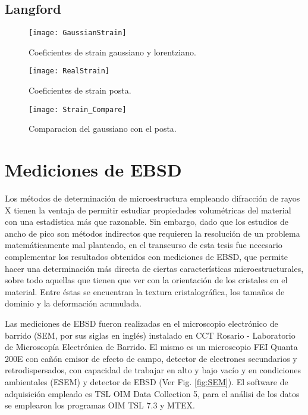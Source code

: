 \subsection{Langford}\label{SS:MLgfrd}

\begin{figure}[!htb]
  \centering
  \texttt{[image: GaussianStrain]}
  \caption{Coeficientes de strain gaussiano y lorentziano.}
  \label{fig:GaussStrainn}
\end{figure}

\begin{figure}[!htb]
  \centering
  \texttt{[image: RealStrain]}
  \caption{Coeficientes de strain posta.}
  \label{fig:RealStrain}
\end{figure}

\begin{figure}[!htb]
  \centering
  \texttt{[image: Strain\_Compare]}
  \caption{Comparacion del gaussiano con el posta.}
  \label{fig:RealvsGauss}
\end{figure}

\newpage
\fi
\section{Mediciones de EBSD}\label{S:MatEBSD}
Los métodos de determinación de microestructura empleando difracción de rayos X tienen la ventaja de permitir estudiar propiedades volumétricas del material con una estadística más que razonable.
Sin embargo, dado que los estudios de ancho de pico son métodos indirectos que requieren la resolución de un problema matemáticamente mal planteado, en el transcurso de esta tesis fue necesario complementar los resultados obtenidos con mediciones de EBSD, que permite hacer una determinación más directa de ciertas características microestructurales, sobre todo aquellas que tienen que ver con la orientación de los cristales en el material.
Entre éstas se encuentran la textura cristalográfica, los tamaños de dominio y la deformación acumulada.

Las mediciones de EBSD fueron realizadas en el microscopio electrónico de barrido (SEM, por sus siglas en inglés) instalado en CCT Rosario - Laboratorio de Microscopía Electrónica de Barrido.
El mismo es un microscopio FEI Quanta 200E con cañón emisor de efecto de campo, detector de electrones secundarios y retrodispersados, con capacidad de trabajar en alto y bajo vacío y en condiciones ambientales (ESEM) y detector de EBSD (Ver Fig. \ref{fig:SEM}).
El software de adquisición empleado es TSL OIM Data Collection 5, para el análisi de los datos se emplearon los programas OIM TSL 7.3 y MTEX.

